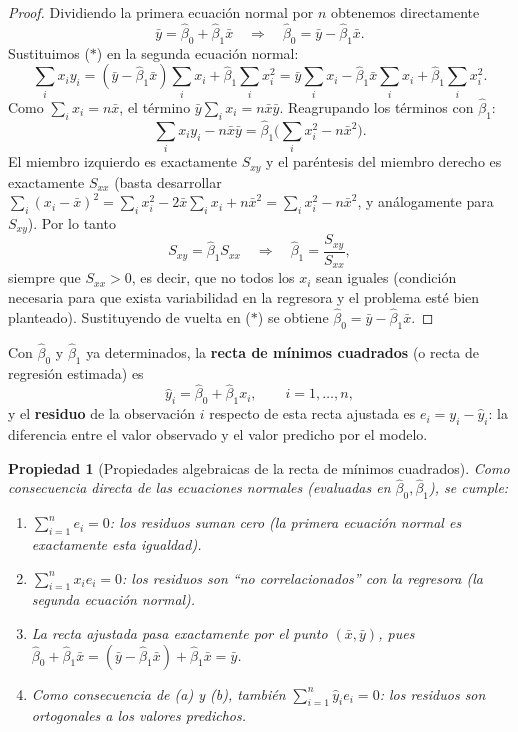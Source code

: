 \documentclass[11pt,a4paper]{article}
\theoremstyle{plain}
\newtheorem{propiedad}[teorema]{Propiedad}
\theoremstyle{definition}
\theoremstyle{remark}
\begin{document}
\begin{proof}
Dividiendo la primera ecuación normal por $n$ obtenemos directamente
\[
\bar y = \hat\beta_0 + \hat\beta_1 \bar x \quad\Longrightarrow\quad \hat\beta_0 = \bar y - \hat\beta_1\bar x. \tag{$\ast$}
\]
Sustituimos ($\ast$) en la segunda ecuación normal:
\[
\sum_i x_iy_i = (\bar y - \hat\beta_1\bar x)\sum_i x_i + \hat\beta_1\sum_i x_i^2 = \bar y\sum_i x_i - \hat\beta_1\bar x\sum_i x_i + \hat\beta_1\sum_i x_i^2.
\]
Como $\sum_i x_i = n\bar x$, el término $\bar y\sum_i x_i = n\bar x\bar y$. Reagrupando los términos con $\hat\beta_1$:
\[
\sum_i x_iy_i - n\bar x\bar y = \hat\beta_1\Big(\sum_i x_i^2 - n\bar x^2\Big).
\]
El miembro izquierdo es exactamente $S_{xy}$ y el paréntesis del miembro derecho es exactamente $S_{xx}$ (basta desarrollar $\sum_i(x_i-\bar x)^2 = \sum_i x_i^2 - 2\bar x\sum_i x_i + n\bar x^2 = \sum_i x_i^2 - n\bar x^2$, y análogamente para $S_{xy}$). Por lo tanto
\[
S_{xy} = \hat\beta_1 S_{xx} \quad\Longrightarrow\quad \hat\beta_1 = \frac{S_{xy}}{S_{xx}},
\]
siempre que $S_{xx}>0$, es decir, que no todos los $x_i$ sean iguales (condición necesaria para que exista variabilidad en la regresora y el problema esté bien planteado). Sustituyendo de vuelta en ($\ast$) se obtiene $\hat\beta_0=\bar y-\hat\beta_1\bar x$.
\end{proof}

Con $\hat\beta_0$ y $\hat\beta_1$ ya determinados, la \textbf{recta de mínimos cuadrados} (o recta de regresión estimada) es
\[
\hat y_i = \hat\beta_0+\hat\beta_1 x_i, \qquad i=1,\dots,n,
\]
y el \textbf{residuo} de la observación $i$ respecto de esta recta ajustada es $e_i = y_i-\hat y_i$: la diferencia entre el valor observado y el valor predicho por el modelo.

\begin{propiedad}[Propiedades algebraicas de la recta de mínimos cuadrados]
Como consecuencia directa de las ecuaciones normales (evaluadas en $\hat\beta_0,\hat\beta_1$), se cumple:
\begin{enumerate}[label=(\alph*)]
\item $\displaystyle\sum_{i=1}^n e_i = 0$: los residuos suman cero (la primera ecuación normal es exactamente esta igualdad).
\item $\displaystyle\sum_{i=1}^n x_i e_i = 0$: los residuos son ``no correlacionados'' con la regresora (la segunda ecuación normal).
\item La recta ajustada pasa exactamente por el punto $(\bar x,\bar y)$, pues $\hat\beta_0+\hat\beta_1\bar x = (\bar y-\hat\beta_1\bar x)+\hat\beta_1\bar x=\bar y$.
\item Como consecuencia de (a) y (b), también $\displaystyle\sum_{i=1}^n \hat y_i e_i = 0$: los residuos son ortogonales a los valores predichos.
\end{enumerate}
\end{propiedad}
\end{document}
